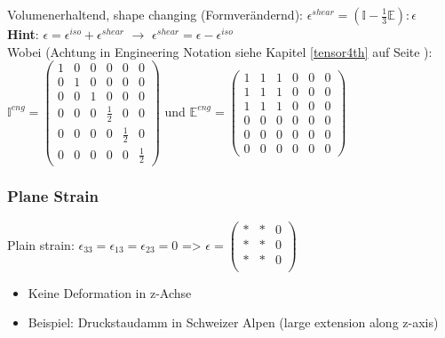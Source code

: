 \documentclass[a4paper]{scrartcl}
\begin{document}
Volumenerhaltend, shape changing (Formverändernd): $\epsilon^{shear} =
(\mathbb{I} - \frac{1}{3} \mathbb{E} ) : \epsilon $\\
\textbf{Hint}: $\epsilon = \epsilon^{iso} + \epsilon^{shear}$ $\rightarrow$
$\epsilon^{shear} = \epsilon -\epsilon^{iso}$\\
Wobei (Achtung in Engineering
Notation siehe Kapitel \ref{tensor4th} auf Seite \pageref{tensor4th}):\\ $ \mathbb{I}^{eng}=
\begin{pmatrix}
1 & 0 & 0 & 0 & 0 & 0 \\ 
0 & 1 & 0 & 0 & 0 & 0 \\ 
0 & 0 & 1 & 0 & 0 & 0 \\ 
0 & 0 & 0 & \frac{1}{2} & 0 & 0 \\ 
0 & 0 & 0 & 0 & \frac{1}{2} & 0 \\ 
0 & 0 & 0 & 0 & 0 & \frac{1}{2}
\end{pmatrix} 
$ und 
$ \mathbb{E}^{eng}=
\begin{pmatrix}
1 & 1 & 1 & 0 & 0 & 0 \\ 
1 & 1 & 1 & 0 & 0 & 0 \\ 
1 & 1 & 1 & 0 & 0 & 0 \\ 
0 & 0 & 0 & 0 & 0 & 0 \\ 
0 & 0 & 0 & 0 & 0 & 0 \\ 
0 & 0 & 0 & 0 & 0 & 0
\end{pmatrix} 
$

\subsubsection{Plane Strain}
Plain strain: $\epsilon_{33} = \epsilon_{13} = \epsilon_{23}= 0$ => $\epsilon =
\begin{pmatrix}
* & * & 0\\
* & * & 0\\
* & * & 0\\
\end{pmatrix} $\\
\begin{itemize}
  \item Keine Deformation in z-Achse
  \item Beispiel: Druckstaudamm in Schweizer Alpen (large extension along
  z-axis)
\end{itemize}
\end{document}
